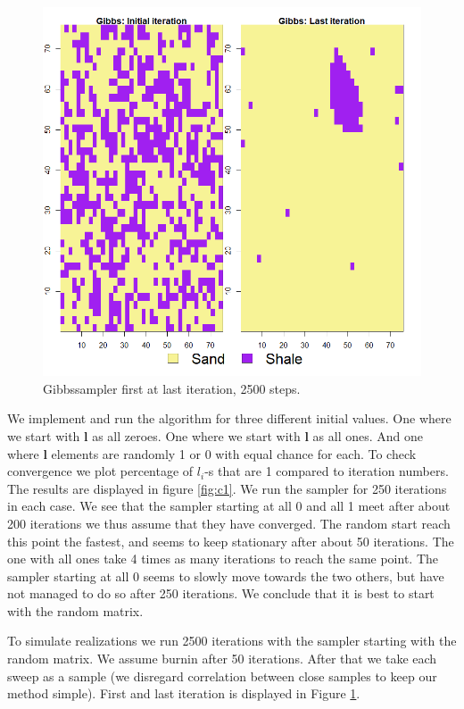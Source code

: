 \documentclass{article}
\newcommand{\vect}[1]{\ensuremath{\boldsymbol{\mathbf{#1}}}}
\begin{document}
\begin{figure}[h]	
	\begin{center} 
		\includegraphics[scale=0.48]{c2.png}
	\end{center}
	\caption{Gibbssampler first at last iteration, 2500 steps.}
	\label{fig:c2} 
\end{figure}




We implement and run the algorithm for three different initial values. One where we start with $\vect l$ as all zeroes. One where we start with $\vect l$ as all ones. And one where $\vect l$ elements are randomly 1 or 0 with equal chance for each. To check convergence we plot percentage of $l_i$-s that are 1 compared to iteration numbers. The results are displayed in figure \ref{fig:c1}. We run the sampler for 250 iterations in each case. We see that the sampler starting at all 0 and all 1 meet after about 200 iterations we thus assume that they have converged. The random start reach this point the fastest, and seems to keep stationary after about 50 iterations. The one with all ones take 4 times as many iterations to reach the same point. The sampler starting at all 0 seems to slowly move towards the two others, but have not managed to do so after 250 iterations. We conclude that it is best to start with the random matrix. 

To simulate realizations we run 2500 iterations with the sampler starting with the random matrix. We assume burnin after 50 iterations. After that we take each sweep as a sample (we disregard correlation between close samples to keep our method simple). First and last iteration is displayed in Figure \ref{fig:c2}. 
\end{document}
